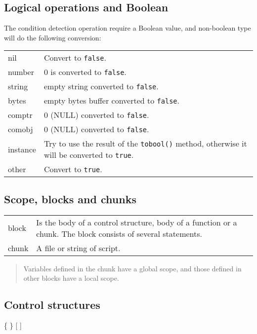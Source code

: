 \subsection*{Logical operations and Boolean}
The condition detection operation require a Boolean value, and non-boolean type will do the following conversion:\\
\begin{tabular}{lp{}}
    \textsf{nil} & Convert to \texttt{false}. \\
    \textsf{number} & 0 is converted to \texttt{false}. \\
    \textsf{string} & empty string converted to \texttt{false}. \\
    \textsf{bytes} & empty bytes buffer converted to \texttt{false}. \\
    \textsf{comptr} & 0 (NULL) converted to \texttt{false}. \\
    \textsf{comobj} & 0 (NULL) converted to \texttt{false}. \\
    \textsf{instance} & Try to use the result of the \texttt{tobool()} method, otherwise it will be converted to \texttt{true}. \\
    \textsf{other} & Convert to \texttt{true}. \\
\end{tabular}


\subsection*{Scope, blocks and chunks}
\begin{tabular}{@{}lp{}}
    \textsf{block} & Is the body of a control structure, body of a function or a chunk. The block consists of several statements. \\
    \textsf{chunk} & A file or string of script. \\
\end{tabular}

\begin{quote}
    Variables defined in the chunk have a global scope, and those defined in other blocks have a local scope.
\end{quote}

\subsection*{Control structures}

\hangpar {}   \{  \} [ ] 

